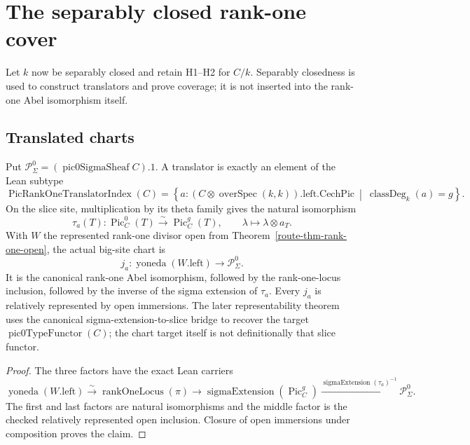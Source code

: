\chapter{The separably closed rank-one cover}
\label{route-ch-sepclosed}

Let \(k\) now be separably closed and retain H1--H2 for \(C/k\).
Separably closedness is used to construct translators and prove coverage; it
is not inserted into the rank-one Abel isomorphism itself.

\section{Translated charts}

\begin{definition}
  \label{route-def-translated-charts}
  \leanok

  Put \(\mathcal P^0_\Sigma=(\operatorname{pic0SigmaSheaf} C).1\).  A
  translator is exactly an element of the Lean subtype
  \[
    \operatorname{PicRankOneTranslatorIndex}(C)
      =\left\{a:(C\mathbin\otimes\operatorname{overSpec}(k,k)).\mathrm{left}.
          \mathrm{CechPic}\ \middle|\
          \operatorname{classDeg}_k(a)=g\right\}.
  \]
  On the slice site, multiplication by its theta family gives the natural
  isomorphism
  \[
    \tau_a(T):\operatorname{Pic}^0_C(T)
       \xrightarrow{\sim}\operatorname{Pic}^{g}_C(T),
    \qquad \lambda\longmapsto\lambda\otimes a_T .
  \]
  With \(W\) the represented rank-one divisor open from
  Theorem~\ref{route-thm-rank-one-open}, the actual big-site chart is
  \[
    j_a:\operatorname{yoneda}(W.\mathrm{left})
      \longrightarrow\mathcal P^0_\Sigma .
  \]
  It is the canonical rank-one Abel isomorphism, followed by the rank-one-locus
  inclusion, followed by the inverse of the sigma extension of \(\tau_a\).
  Every \(j_a\) is relatively represented by open immersions.  The later
  representability theorem uses the canonical sigma-extension-to-slice bridge
  to recover the target \(\operatorname{pic0TypeFunctor}(C)\); the chart target
  itself is not definitionally that slice functor.
\end{definition}

\begin{proof}
  The three factors have the exact Lean carriers
  \[
    \operatorname{yoneda}(W.\mathrm{left})\xrightarrow{\sim}
    \operatorname{rankOneLocus}(\pi)
      \longrightarrow
    \operatorname{sigmaExtension}(\operatorname{Pic}^{g}_C)
      \xrightarrow{\operatorname{sigmaExtension}(\tau_a)^{-1}}
    \mathcal P^0_\Sigma .
  \]
  The first and last factors are natural isomorphisms and the middle factor is
  the checked relatively
  represented open inclusion.  Closure of open immersions under composition
  proves the claim.
\end{proof}

